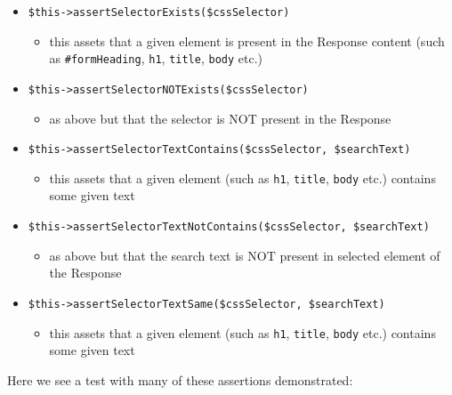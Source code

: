 \documentclass[a4paperpaper,openright]{book}
\providecommand{\tightlist}{%
  \setlength{\itemsep}{0pt}\setlength{\parskip}{0pt}}
\begin{document}
\begin{itemize}
\item
  \texttt{\$this-\textgreater{}assertSelectorExists(\$cssSelector)}

  \begin{itemize}
  \tightlist
  \item
    this assets that a given element is present in the Response content
    (such as \texttt{\#formHeading}, \texttt{h1}, \texttt{title},
    \texttt{body} etc.)
  \end{itemize}
\item
  \texttt{\$this-\textgreater{}assertSelectorNOTExists(\$cssSelector)}

  \begin{itemize}
  \tightlist
  \item
    as above but that the selector is NOT present in the Response
  \end{itemize}
\item
  \texttt{\$this-\textgreater{}assertSelectorTextContains(\$cssSelector,\ \$searchText)}

  \begin{itemize}
  \tightlist
  \item
    this assets that a given element (such as \texttt{h1},
    \texttt{title}, \texttt{body} etc.) contains some given text
  \end{itemize}
\item
  \texttt{\$this-\textgreater{}assertSelectorTextNotContains(\$cssSelector,\ \$searchText)}

  \begin{itemize}
  \tightlist
  \item
    as above but that the search text is NOT present in selected element
    of the Response
  \end{itemize}
\item
  \texttt{\$this-\textgreater{}assertSelectorTextSame(\$cssSelector,\ \$searchText)}

  \begin{itemize}
  \tightlist
  \item
    this assets that a given element (such as \texttt{h1},
    \texttt{title}, \texttt{body} etc.) contains some given text
  \end{itemize}
\end{itemize}

Here we see a test with many of these assertions demonstrated:
\end{document}
